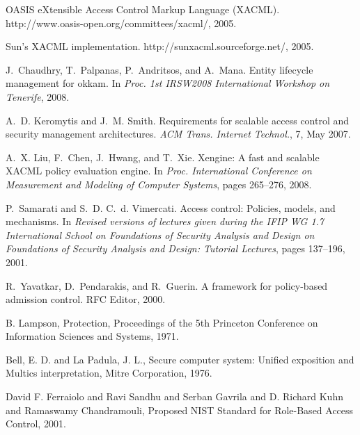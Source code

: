 \documentclass{acm_proc_article-sp}
\begin{document}
%


%
%





%
%
%
\nocite{*}
\begin{thebibliography}{1}

{OASIS eXtensible Access Control Markup Language (XACML)}.
{http://www.oasis-open.org/committees/xacml/}, 2005.

{Sun's XACML implementation}.
{http://sunxacml.sourceforge.net/}, 2005.

J.~Chaudhry, T.~Palpanas, P.~Andritsos, and A.~Mana.
 Entity lifecycle management for okkam.
In {\em Proc. 1st IRSW2008 International Workshop on Tenerife}, 2008.

A.~D. Keromytis and J.~M. Smith.
 Requirements for scalable access control and security management
  architectures.
 {\em ACM Trans. Internet Technol.}, 7, May 2007.

A.~X. Liu, F.~Chen, J.~Hwang, and T.~Xie.
 Xengine: A fast and scalable {XACML} policy evaluation engine.
 In {\em Proc. International Conference on Measurement and Modeling of
  Computer Systems}, pages 265--276, 2008.

P.~Samarati and S.~D. C.~d. Vimercati.
 Access control: Policies, models, and mechanisms.
 In {\em Revised versions of lectures given during the IFIP WG 1.7
  International School on Foundations of Security Analysis and Design on
  Foundations of Security Analysis and Design: Tutorial Lectures}, pages
  137--196, 2001.

R.~Yavatkar, D.~Pendarakis, and R.~Guerin.
 A framework for policy-based admission control.
 RFC Editor, 2000.

B. Lampson,
    Protection,
Proceedings of the 5th Princeton Conference on Information Sciences and Systems, 
1971.


Bell, E. D. and La Padula, J. L.,
Secure computer system: Unified exposition and Multics interpretation,
Mitre Corporation,
1976.


David F. Ferraiolo and Ravi Sandhu and Serban Gavrila and D. Richard Kuhn and Ramaswamy Chandramouli,
Proposed NIST Standard for Role-Based Access Control,
2001.



\end{thebibliography}
\end{document}
